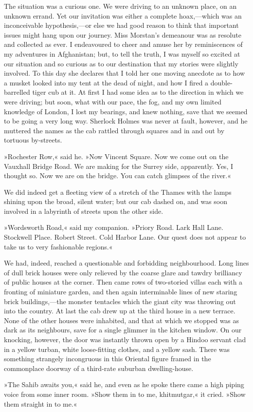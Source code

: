 The situation was a curious one. We were driving to an unknown place, on an unknown errand. Yet our invitation was either a complete hoax,—which was an inconceivable hypothesis,—or else we had good reason to think that important issues might hang upon our journey. Miss Morstan's demeanour was as resolute and collected as ever. I endeavoured to cheer and amuse her by reminiscences of my adventures in Afghanistan; but, to tell the truth, I was myself so excited at our situation and so curious as to our destination that my stories were slightly involved. To this day she declares that I told her one moving anecdote as to how a musket looked into my tent at the dead of night, and how I fired a double-barrelled tiger cub at it. At first I had some idea as to the direction in which we were driving; but soon, what with our pace, the fog, and my own limited knowledge of London, I lost my bearings, and knew nothing, save that we seemed to be going a very long way. Sherlock Holmes was never at fault, however, and he muttered the names as the cab rattled through squares and in and out by tortuous by-streets.

»Rochester Row,« said he. »Now Vincent Square. Now we come out on the Vauxhall Bridge Road. We are making for the Surrey side, apparently. Yes, I thought so. Now we are on the bridge. You can catch glimpses of the river.«

We did indeed get a fleeting view of a stretch of the Thames with the lamps shining upon the broad, silent water; but our cab dashed on, and was soon involved in a labyrinth of streets upon the other side.

»Wordsworth Road,« said my companion. »Priory Road. Lark Hall Lane. Stockwell Place. Robert Street. Cold Harbor Lane. Our quest does not appear to take us to very fashionable regions.«

We had, indeed, reached a questionable and forbidding neighbourhood. Long lines of dull brick houses were only relieved by the coarse glare and tawdry brilliancy of public houses at the corner. Then came rows of two-storied villas each with a fronting of miniature garden, and then again interminable lines of new staring brick buildings,—the monster tentacles which the giant city was throwing out into the country. At last the cab drew up at the third house in a new terrace. None of the other houses were inhabited, and that at which we stopped was as dark as its neighbours, save for a single glimmer in the kitchen window. On our knocking, however, the door was instantly thrown open by a Hindoo servant clad in a yellow turban, white loose-fitting clothes, and a yellow sash. There was something strangely incongruous in this Oriental figure framed in the commonplace doorway of a third-rate suburban dwelling-house.

»The Sahib awaits you,« said he, and even as he spoke there came a high piping voice from some inner room. »Show them in to me, khitmutgar,« it cried. »Show them straight in to me.«